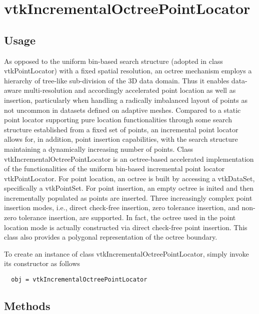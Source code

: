 \section{vtkIncrementalOctreePointLocator}

\subsection{Usage}

  As opposed to the uniform bin-based search structure (adopted in class
  vtkPointLocator) with a fixed spatial resolution, an octree mechanism 
  employs a hierarchy of tree-like sub-division of the 3D data domain. Thus
  it enables data-aware multi-resolution and accordingly accelerated point
  location as well as insertion, particularly when handling a radically 
  imbalanced layout of points as not uncommon in datasets defined on 
  adaptive meshes. Compared to a static point locator supporting pure
  location functionalities through some search structure established from
  a fixed set of points, an incremental point locator allows for, in addition,
  point insertion capabilities, with the search structure maintaining a 
  dynamically increasing number of points.
  Class vtkIncrementalOctreePointLocator is an octree-based accelerated
  implementation of the functionalities of the uniform bin-based incremental
  point locator vtkPointLocator. For point location, an octree is built by
  accessing a vtkDataSet, specifically a vtkPointSet. For point insertion,
  an empty octree is inited and then incrementally populated as points are
  inserted. Three increasingly complex point insertion modes, i.e., direct
  check-free insertion, zero tolerance insertion, and non-zero tolerance 
  insertion, are supported. In fact, the octree used in the point location
  mode is actually constructed via direct check-free point insertion. This
  class also provides a polygonal representation of the octree boundary.
  

To create an instance of class vtkIncrementalOctreePointLocator, simply
invoke its constructor as follows
\begin{verbatim}
  obj = vtkIncrementalOctreePointLocator
\end{verbatim}
\subsection{Methods}

